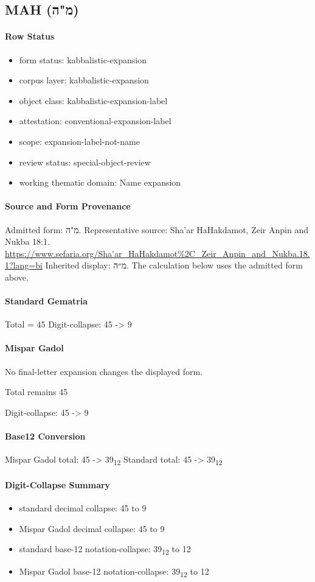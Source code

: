 \subsection{MAH (מ"ה)}
\paragraph{Row Status}
\begin{itemize}
\item form status: kabbalistic-expansion
\item corpus layer: kabbalistic-expansion
\item object class: kabbalistic-expansion-label
\item attestation: conventional-expansion-label
\item scope: expansion-label-not-name
\item review status: special-object-review
\item working thematic domain: Name expansion
\end{itemize}
\paragraph{Source and Form Provenance}
Admitted form: מ"ה.
Representative source: Sha'ar HaHakdamot, Zeir Anpin and Nukba 18:1.
\url{https://www.sefaria.org/Sha'ar_HaHakdamot%2C_Zeir_Anpin_and_Nukba.18.1?lang=bi}
Inherited display: מ״ה. The calculation below uses the admitted form above.
\paragraph{Standard Gematria}
Total = 45
Digit-collapse: 45 -> 9
\paragraph{Mispar Gadol}
No final-letter expansion changes the displayed form.

Total remains 45

Digit-collapse: 45 -> 9
\paragraph{Base12 Conversion}
Mispar Gadol total: 45 -> 39\textsubscript{12}
Standard total: 45 -> 39\textsubscript{12}
\paragraph{Digit-Collapse Summary}
\begin{itemize}
\item standard decimal collapse: 45 to 9
\item Mispar Gadol decimal collapse: 45 to 9
\item standard base-12 notation-collapse: 39\textsubscript{12} to 12
\item Mispar Gadol base-12 notation-collapse: 39\textsubscript{12} to 12
\end{itemize}
